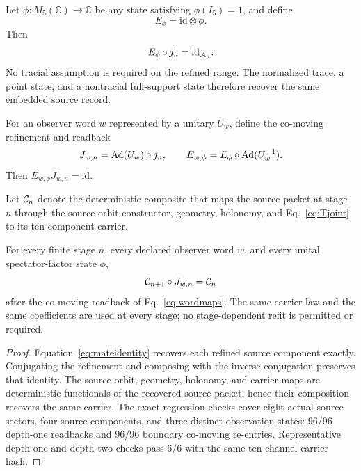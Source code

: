 Let $\phi:M_5(\mathbb C)\to\mathbb C$ be any state satisfying $\phi(I_5)=1$, and define
\begin{equation}\label{eq:obsmate}
 E_\phi=\mathrm{id}\otimes\phi.
\end{equation}
Then
\begin{equation}\label{eq:mateidentity}
 E_\phi\circ j_n=\mathrm{id}_{\mathcal{A}_n}.
\end{equation}
No tracial assumption is required on the refined range. The normalized trace, a point state, and a nontracial full-support state therefore recover the same embedded source record.

For an observer word $w$ represented by a unitary $U_w$, define the co-moving refinement and readback
\begin{equation}\label{eq:wordmaps}
 J_{w,n}=\operatorname{Ad}(U_w)\circ j_n,
 \qquad
 E_{w,\phi}=E_\phi\circ\operatorname{Ad}(U_w^{-1}).
\end{equation}
Then $E_{w,\phi}J_{w,n}=\mathrm{id}$.

Let $\mathcal{C}_n$ denote the deterministic composite that maps the source packet at stage $n$ through the source-orbit constructor, geometry, holonomy, and Eq.~\eqref{eq:Tjoint} to its ten-component carrier.

\begin{theorem}\label{thm:x61}
For every finite stage $n$, every declared observer word $w$, and every unital spectator-factor state $\phi$,
\begin{equation}\label{eq:naturality}
 \mathcal{C}_{n+1}\circ J_{w,n}=\mathcal{C}_n
\end{equation}
after the co-moving readback of Eq.~\eqref{eq:wordmaps}. The same carrier law and the same coefficients are used at every stage; no stage-dependent refit is permitted or required.
\end{theorem}

\begin{proof}
Equation~\eqref{eq:mateidentity} recovers each refined source component exactly. Conjugating the refinement and composing with the inverse conjugation preserves that identity. The source-orbit, geometry, holonomy, and carrier maps are deterministic functionals of the recovered source packet, hence their composition recovers the same carrier. The exact regression checks cover eight actual source sectors, four source components, and three distinct observation states: 96/96 depth-one readbacks and 96/96 boundary co-moving re-entries. Representative depth-one and depth-two checks pass 6/6 with the same ten-channel carrier hash.
\end{proof}

